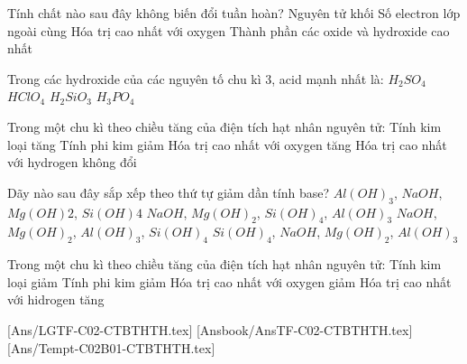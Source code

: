 \documentclass[Main_HOA10.tex]{subfiles}
\begin{document}
\begin{ex}%
	Tính chất nào sau đây không biến đổi tuần hoàn?
	\choice
	{\True Nguyên tử khối}
	{Số electron lớp ngoài cùng}
	{Hóa trị cao nhất với oxygen}
	{Thành phần các oxide và hydroxide cao nhất}
\end{ex}
\begin{ex}%
	Trong các hydroxide của các nguyên tố chu kì 3, acid mạnh nhất là:
	\choice
	{$H_2SO_4$}
	{\True $HClO_4$}
	{$H_2SiO_3$}
	{$H_3PO_4$}
\end{ex}
\begin{ex}%
	Trong một chu kì theo chiều tăng của điện tích hạt nhân nguyên tử:
	\choice
	{Tính kim loại tăng}
	{Tính phi kim giảm}
	{\True Hóa trị cao nhất với oxygen tăng}
	{Hóa trị cao nhất với hydrogen không đổi}
\end{ex}
\begin{ex}%
	Dãy nào sau đây sắp xếp theo thứ tự giảm dần tính base?
	\choice
	{$Al(OH)_3$, $NaOH$, $Mg(OH)2$, $Si(OH)4$}
	{$NaOH$, $Mg(OH)_2$, $Si(OH)_4$, $Al(OH)_3$}
	{$NaOH$, $Mg(OH)_2$, $Al(OH)_3$, $Si(OH)_4$}
	{$Si(OH)_4$, $NaOH$, $Mg(OH)_2$, $Al(OH)_3$}
\end{ex}
\begin{ex}%
	Trong một chu kì theo chiều tăng của điện tích hạt nhân nguyên tử:
	\choice
	{Tính kim loại giảm}
	{Tính phi kim giảm}
	{Hóa trị cao nhất với oxygen giảm}
	{Hóa trị cao nhất với hidrogen tăng}
\end{ex}

[Ans/LGTF-C02-CTBTHTH.tex]
[Ansbook/AnsTF-C02-CTBTHTH.tex]
[Ans/Tempt-C02B01-CTBTHTH.tex]
\luulgEXTF
\begin{ex}
	\choiceTF[t]
	{}
	{}
	{}
	{}
	\loigiai{}
\end{ex}
\begin{ex}
	\choiceTF[t]
	{}
	{}
	{}
	{}
	\loigiai{}
\end{ex}
\end{document}
